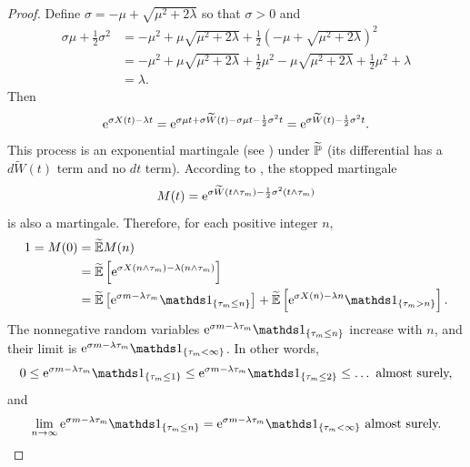 \begin{proof}

	Define $\sigma = -\mu + \sqrt{\mu^2 + 2\lambda}$ so that $\sigma > 0$ and
	\begin{align*}
		\sigma \mu + \frac{1}{2}\sigma^2 & = -\mu^2 + \mu\sqrt{\mu^2 + 2\lambda} + \frac{1}{2}\left(-\mu + \sqrt{\mu^2 + 2\lambda}\right)^2                   \\
		                                 & = -\mu^2 + \mu\sqrt{\mu^2 + 2\lambda} + \frac{1}{2}\mu^2 - \mu\sqrt{\mu^2 + 2\lambda} + \frac{1}{2}\mu^2 + \lambda \\
		                                 & = \lambda.
	\end{align*}
	Then
	\[
		\mathrm{e}^{\sigma X(t)-\lambda t} = \mathrm{e}^{\sigma \mu t + \sigma \widetilde{W}(t) - \sigma \mu t - \frac{1}{2}\sigma^2 t} = \mathrm{e}^{\sigma \widetilde{W}(t) - \frac{1}{2}\sigma^2 t}.
	\]
	This process is an exponential martingale (see ) under $\widetilde{\mathbb{P}}$ (its differential has a $d\widetilde{W}(t)$ term and no $dt$ term). According to , the stopped martingale
	\[
		M(t) = \mathrm{e}^{\sigma \widetilde{W}(t \wedge \tau_m) - \frac{1}{2}\sigma^2 (t \wedge \tau_m)}
	\]
	is also a martingale. Therefore, for each positive integer $n$,
	\begin{align}
		1 = M(0) & = \widetilde{\E}M(n) \nonumber                                                                                                                                                            \\
		         & = \widetilde{\E}\left[\e^{\sigma X(n \wedge \tau_m) - \lambda(n \wedge \tau_m)}\right] \nonumber                                                                                          \\
		         & = \widetilde{\E}\left[\e^{\sigma m - \lambda \tau_m}\I_{\{\tau_m \le n\}}\right] + \widetilde{\E}\left[\e^{\sigma X(n) - \lambda n}\I_{\{\tau_m > n\}}\right]. \label{eq:MartingaleSplit}
	\end{align}
	The nonnegative random variables $\e^{\sigma m - \lambda \tau_m}\I_{\{\tau_m \le n\}}$ increase with $n$, and their limit is $\e^{\sigma m - \lambda \tau_m}\I_{\{\tau_m < \infty\}}$. In other words,
	\[
		0 \le \e^{\sigma m - \lambda \tau_m}\I_{\{\tau_m \le 1\}} \le \e^{\sigma m - \lambda \tau_m}\I_{\{\tau_m \le 2\}} \le \dots \text{ almost surely,}
	\]
	and
	\[
		\lim_{n \to \infty} \e^{\sigma m - \lambda \tau_m}\I_{\{\tau_m \le n\}} = \e^{\sigma m - \lambda \tau_m}\I_{\{\tau_m < \infty\}} \text{ almost surely.}
\]
\end{proof}
